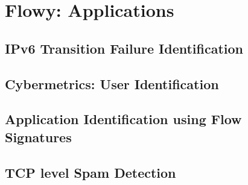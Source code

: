 \chapter{Flowy: Applications}\label{ch:flowy-applications}

\section{IPv6 Transition 
		 Failure Identification}\label{sec:ipv6transeval}
\section{Cybermetrics: User Identification}\label{sec:cybermetrics}
\section{Application Identification using
		 Flow Signatures}\label{sec:application-signatures}
\section{TCP level Spam Detection}\label{sec:spam-detection}